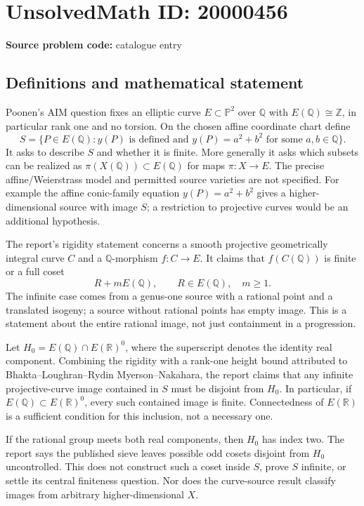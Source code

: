 \documentclass[11pt]{article}
\newcommand{\Z}{\mathbb{Z}}
\newcommand{\Q}{\mathbb{Q}}
\newcommand{\R}{\mathbb{R}}
\newcommand{\PP}{\mathbb{P}}
\begin{document}
\section*{UnsolvedMath ID: 20000456}
\textbf{Source problem code:} catalogue entry
\subsection{Definitions and mathematical statement}
Poonen's AIM question fixes an elliptic curve $E\subset\PP^2$ over $\Q$ with $E(\Q)\cong\Z$, in particular rank one and no torsion. On the chosen affine coordinate chart define
\[
 S=\{P\in E(\Q):y(P)\text{ is defined and }y(P)=a^2+b^2\text{ for some }a,b\in\Q\}.
\]
It asks to describe $S$ and whether it is finite. More generally it asks which subsets can be realized as $\pi(X(\Q))\subset E(\Q)$ for maps $\pi:X\to E$. The precise affine/Weierstrass model and permitted source varieties are not specified. For example the affine conic-family equation $y(P)=a^2+b^2$ gives a higher-dimensional source with image $S$; a restriction to projective curves would be an additional hypothesis.

The report's rigidity statement concerns a smooth projective geometrically integral curve $C$ and a $\Q$-morphism $f:C\to E$. It claims that $f(C(\Q))$ is finite or a full coset
\[
 R+mE(\Q),\qquad R\in E(\Q),\quad m\geq1.
\]
The infinite case comes from a genus-one source with a rational point and a translated isogeny; a source without rational points has empty image. This is a statement about the entire rational image, not just containment in a progression.

Let $H_0=E(\Q)\cap E(\R)^0$, where the superscript denotes the identity real component. Combining the rigidity with a rank-one height bound attributed to Bhakta--Loughran--Rydin Myerson--Nakahara, the report claims that any infinite projective-curve image contained in $S$ must be disjoint from $H_0$. In particular, if $E(\Q)\subset E(\R)^0$, every such contained image is finite. Connectedness of $E(\R)$ is a sufficient condition for this inclusion, not a necessary one.

If the rational group meets both real components, then $H_0$ has index two. The report says the published sieve leaves possible odd cosets disjoint from $H_0$ uncontrolled. This does not construct such a coset inside $S$, prove $S$ infinite, or settle its central finiteness question. Nor does the curve-source result classify images from arbitrary higher-dimensional $X$.
\end{document}
